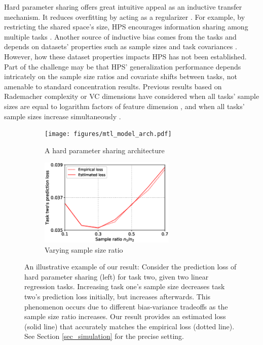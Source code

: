 Hard parameter sharing offers great intuitive appeal as an inductive transfer mechanism.
It reduces overfitting by acting as a regularizer \cite{R17}.
For example, by restricting the shared space's size, HPS encourages information sharing among multiple tasks \cite{KD12}.
Another source of inductive bias comes from the tasks and depends on datasets' properties such as sample sizes and task covariances \cite{WZR20}.
However, how these dataset properties impacts HPS has not been established.
Part of the challenge may be that HPS' generalization performance depends intricately on the sample size ratios and covariate shifts between tasks, not amenable to standard concentration results.
Previous results based on Rademacher complexity or VC dimensions have considered when all tasks' sample sizes are equal to logarithm factors of feature dimension \cite{B00,MPR16}, and when all tasks' sample sizes increase simultaneously \cite{AZ05,M06}.

\begin{figure}[!t]
	\begin{subfigure}[t]{0.5\textwidth}
		\centering
		\texttt{[image: figures/mtl\_model\_arch.pdf]}
		\caption{A hard parameter sharing architecture}
	\end{subfigure}\hfill
	\begin{subfigure}[t]{0.5\textwidth}
		\centering
		\includegraphics[width=0.713\textwidth,valign=t]{figures/sample_ratio_c2_400.eps}
		\caption{Varying sample size ratio}
		\label{fig_intro_sample_size_b}
	\end{subfigure}
	\caption{An illustrative example of our result:
	Consider the prediction loss of hard parameter sharing (left) for task two, given two linear regression tasks.
	Increasing task one's sample size decreases task two's prediction loss initially, but increases afterwards. This phenomenon occurs due to different bias-variance tradeoffs as the sample size ratio increases. Our result provides an estimated loss (solid line) that accurately matches the empirical loss (dotted line).
	See Section \ref{sec_simulation} for the precise setting.}
	\label{fig_intro_sample_size}
\end{figure}



